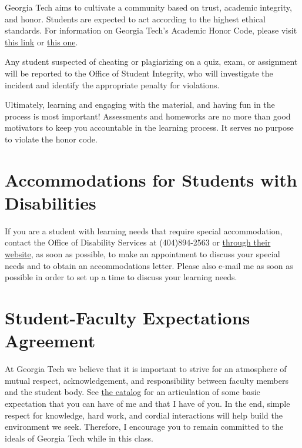 \documentclass[12pt]{article}
\begin{document}
Georgia Tech aims to cultivate a community based on trust, academic integrity, and honor. Students are expected to act according to the highest ethical standards.  For information on Georgia Tech's Academic Honor Code, please visit \href{http://www.catalog.gatech.edu/policies/honor-code/}{this link} or \href{http://www.catalog.gatech.edu/rules/18/}{this one}. 

Any student suspected of cheating or plagiarizing on a quiz, exam, or assignment will be reported to the Office of Student Integrity, who will investigate the incident and identify the appropriate penalty for violations.

Ultimately, learning and engaging with the material, and having fun in the process is most important! Assessments and homeworks are no more than good motivators to keep you accountable in the learning process. It serves no purpose to violate the honor code. 

\section{Accommodations for Students with Disabilities} 

If you are a student with learning needs that require special accommodation, contact the Office of Disability Services at (404)894-2563 or \href{http://disabilityservices.gatech.edu/}{through their website}, as soon as possible, to make an appointment to discuss your special needs and to obtain an accommodations letter.  Please also e-mail me as soon as possible in order to set up a time to discuss your learning needs. 

\section{Student-Faculty Expectations Agreement} 

At Georgia Tech we believe that it is important to strive for an atmosphere of mutual respect, acknowledgement, and responsibility between faculty members and the student body. See \href{http://www.catalog.gatech.edu/rules/22/}{the catalog} for an articulation of some basic expectation that you can have of me and that I have of you. In the end, simple respect for knowledge, hard work, and cordial interactions will help build the environment we seek. Therefore, I encourage you to remain committed to the ideals of Georgia Tech while in this class. 


\end{document}

